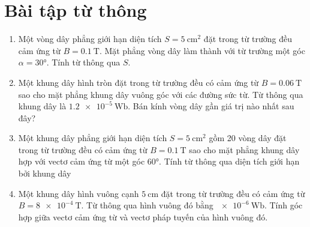 \section{Bài tập từ thông}
\begin{enumerate}
	\item
	{
		Một vòng dây phẳng giới hạn diện tích $S=\SI{5}{\centi \meter \squared}$ đặt trong từ trường đều cảm ứng từ $B=\SI{0.1}{\tesla}$. Mặt phẳng vòng dây làm thành với từ trường một góc $\alpha = \ang{30}$. Tính từ thông qua $S$.
	}
	\item
	{
		Một khung dây hình tròn đặt trong từ trường đều có cảm ứng từ $B=\SI{0.06}{\tesla}$ sao cho mặt phẳng khung dây vuông góc với các đường sức từ. Từ thông qua khung dây là $\SI{1.2e-5}{\weber}$. Bán kính vòng dây gần giá trị nào nhất sau đây?
	}
	\item
	{
		Một khung dây phẳng giới hạn diện tích $S=\SI{5}{\centi \meter \squared}$ gồm 20 vòng dây đặt trong từ trường đều có cảm ứng từ $B=\SI{0.1}{\tesla}$ sao cho mặt phẳng khung dây hợp với vectơ cảm ứng từ một góc $\ang{60}$. Tính từ thông qua diện tích giới hạn bởi khung dây
	}
	\item
	{
		Một khung dây hình vuông cạnh $\SI{5}{\centi \meter}$ đặt trong từ trường đều có cảm ứng từ $B=\SI{8e-4}{\tesla}$. Từ thông qua hình vuông đó bằng $\SI{e-6}{\weber}$. Tính góc hợp giữa vectơ cảm ứng từ và vectơ pháp tuyến của hình vuông đó.
}
\end{enumerate}
